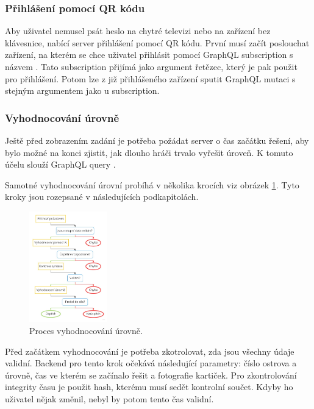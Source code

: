 \subsubsection{Přihlášení pomocí QR kódu}
Aby uživatel nemusel psát heslo na chytré televizi nebo na zařízení bez klávesnice, nabící server přihlášení pomocí QR kódu. První musí začít poslouchat zařízení, na kterém se chce uživatel přihlásit pomocí GraphQL subscription s názvem . Tato subscription přijímá jako argument řetězec, který je pak použit pro přihlášení. Potom lze z již přihlášeného zařízení sputit GraphQL mutaci  s stejným argumentem jako u subscription.

\subsubsection{Vyhodnocování úrovně}
Ještě před zobrazením zadání je potřeba požádat server o čas začátku řešení, aby bylo možné na konci zjistit, jak dlouho hráči trvalo vyřešit úroveň. K tomuto účelu slouží GraphQL query .\par
Samotné vyhodnocování úrovní probíhá v několika krocích viz obrázek \ref{fig:proces-vyhodnocovani}. Tyto kroky jsou rozepsané v následujících podkapitolách.

\begin{figure}[h]
    \centering
    \includegraphics[width=0.3\textwidth]{img/proces.jpg}
    \caption{Proces vyhodnocování úrovně.}
    \label{fig:proces-vyhodnocovani}
\end{figure}

Před začátkem vyhodnocování je potřeba zkotrolovat, zda jsou všechny údaje validní. Backend pro tento krok očekává následující parametry: číslo ostrova a úrovně, čas ve kterém se začínalo řešit a fotografie kartiček. Pro zkontrolování integrity času je použit hash, kterému musí sedět kontrolní součet. Kdyby ho uživatel nějak změnil, nebyl by potom tento čas validní.

